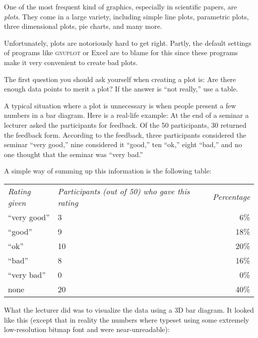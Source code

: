 One of the most frequent kind of graphics, especially in scientific papers, are
\emph{plots}. They come in a large variety, including simple line plots,
parametric plots, three dimensional plots, pie charts, and many more.

Unfortunately, plots are notoriously hard to get right. Partly, the default
settings of programs like \textsc{gnuplot} or Excel are to blame for this since
these programs make it very convenient to create bad plots.

The first question you should ask yourself when creating a plot is: Are there
enough data points to merit a plot? If the answer is ``not really,'' use a
table.

A typical situation where a plot is unnecessary is when people present a few
numbers in a bar diagram. Here is a real-life example: At the end of a seminar
a lecturer asked the participants for feedback. Of the 50 participants, 30
returned the feedback form. According to the feedback, three participants
considered the seminar ``very good,'' nine considered it  ``good,'' ten ``ok,''
eight ``bad,'' and no one thought that the seminar was ``very bad.''

A simple way of summing up this information is the following table:

\medskip
\begin{tabular}{lp{3.75cm}r}
  \emph{Rating given} & \raggedright\emph{Participants (out of 50) who gave this rating} &
  \emph{Percentage} \\[1.75em]
  ``very good'' & \hfil\hphantom{0}3\hfil & \hphantom{0}6\% \\
  ``good'' & \hfil\hphantom{0}9\hfil & 18\% \\
  ``ok'' & \hfil10\hfil & 20\% \\
  ``bad'' & \hfil\hphantom{0}8\hfil & 16\% \\
  ``very bad'' & \hfil\hphantom{0}0\hfil & \hphantom{0}0\% \\[2mm]
  none & \hfil20\hfil & 40\% \\
\end{tabular}

\bigskip
What the lecturer did was to visualize the data using a 3D bar diagram. It
looked like this (except that in reality the numbers where typeset using some
extremely low-resolution bitmap font and were near-unreadable):

